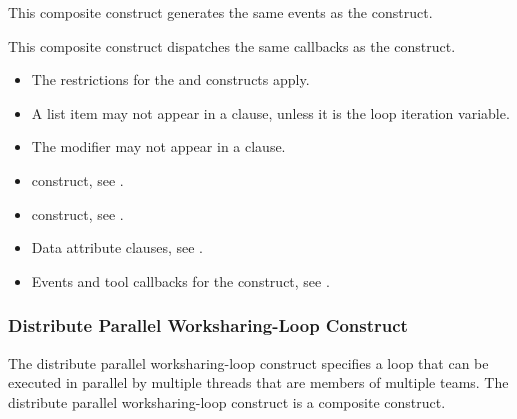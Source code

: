 \events

This composite construct generates the same events as the  construct.

\tools

This composite construct dispatches the same callbacks as the  construct.

\restrictions
\begin{itemize}
\item The restrictions for the  and  constructs apply.

\item A list item may not appear in a  clause, unless it is the loop iteration variable.

\item The  modifier may not appear in a  clause.
\end{itemize}

\crossreferences
\begin{itemize}
\item {} construct, see
.

\item {} construct, see
.

\item Data attribute clauses, see
.

\item Events and tool callbacks for the  construct, see
.

\end{itemize}









\subsubsection{Distribute Parallel Worksharing-Loop Construct}
\label{subsec:Distribute Parallel Worksharing-Loop Construct}
\summary
The distribute parallel worksharing-loop construct specifies a loop that can be executed in parallel by
multiple threads that are members of multiple teams. The distribute parallel worksharing-loop construct is a composite construct.

